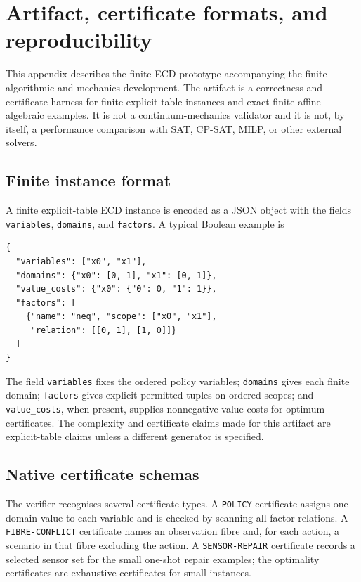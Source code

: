 \appendix
\section{Artifact, certificate formats, and reproducibility}
\label{app:artifact}

This appendix describes the finite ECD prototype accompanying the finite
algorithmic and mechanics development. The artifact is a correctness and
certificate harness for finite explicit-table instances and exact finite affine
algebraic examples. It is not a continuum-mechanics validator and it is not, by
itself, a performance comparison with SAT, CP-SAT, MILP, or other external
solvers.

\subsection{Finite instance format}

A finite explicit-table ECD instance is encoded as a JSON object with the fields
\texttt{variables}, \texttt{domains}, and \texttt{factors}. A typical Boolean
example is
\begin{verbatim}
{
  "variables": ["x0", "x1"],
  "domains": {"x0": [0, 1], "x1": [0, 1]},
  "value_costs": {"x0": {"0": 0, "1": 1}},
  "factors": [
    {"name": "neq", "scope": ["x0", "x1"],
     "relation": [[0, 1], [1, 0]]}
  ]
}
\end{verbatim}
The field \texttt{variables} fixes the ordered policy variables; \texttt{domains}
gives each finite domain; \texttt{factors} gives explicit permitted tuples on
ordered scopes; and \texttt{value\_costs}, when present, supplies nonnegative
value costs for optimum certificates. The complexity and certificate claims made
for this artifact are explicit-table claims unless a different generator is
specified.

\subsection{Native certificate schemas}

The verifier recognises several certificate types. A \texttt{POLICY} certificate
assigns one domain value to each variable and is checked by scanning all factor
relations. A \texttt{FIBRE-CONFLICT} certificate names an observation fibre and,
for each action, a scenario in that fibre excluding the action. A
\texttt{SENSOR-REPAIR} certificate records a selected sensor set for the small
one-shot repair examples; the optimality certificates are exhaustive
certificates for small instances.

